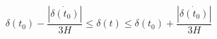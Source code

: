 \begin{equation}\label{condition1}
\delta(t_0)-\frac{|\dot{\delta(t_0)}|}{3H}\leq \delta(t)\leq
\delta(t_0)+\frac{|\dot{\delta(t_0)}|}{3H}
\end{equation}

